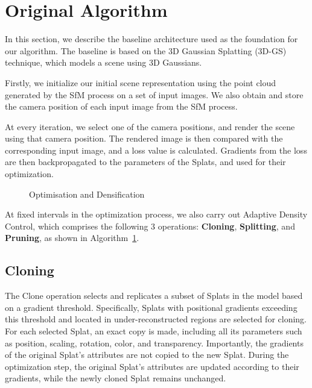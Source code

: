 \documentclass[11pt]{report}
\begin{document}
\section{Original Algorithm}

In this section, we describe the baseline architecture used as the foundation for our algorithm. The baseline is based on the 3D Gaussian Splatting (3D-GS) technique, which models a scene using 3D Gaussians. 

Firstly, we initialize our initial scene representation using the point cloud generated by the SfM process on a set of input images. We also obtain and store the camera position of each input image from the SfM process.

At every iteration, we select one of the camera positions, and render the scene using that camera position. The rendered image is then compared with the corresponding input image, and a loss value is calculated. Gradients from the loss are then backpropagated to the parameters of the Splats, and used for their optimization.

\begin{figure}[htbp]%
    \centering
    \begin{minipage}{0.75\textwidth}

            \begin{algorithm}[H]
                
                \caption{Optimisation and Densification}
                \label{alg:original_algorithm} 
            \end{algorithm}
    \end{minipage}
\end{figure}

At fixed intervals in the optimization process, we also carry out Adaptive Density Control, which comprises the following 3 operations: \textbf{Cloning}, \textbf{Splitting}, and \textbf{Pruning}, as shown in Algorithm~\ref{alg:original_algorithm}.

\subsection{Cloning}
The Clone operation selects and replicates a subset of Splats in the model based on a gradient threshold. Specifically, Splats with positional gradients exceeding this threshold and located in under-reconstructed regions are selected for cloning. For each selected Splat, an exact copy is made, including all its parameters such as position, scaling, rotation, color, and transparency. Importantly, the gradients of the original Splat's attributes are not copied to the new Splat. During the optimization step, the original Splat's attributes are updated according to their gradients, while the newly cloned Splat remains unchanged.
\end{document}
